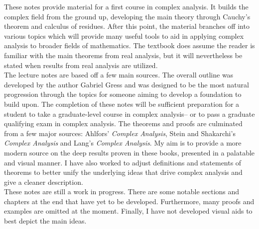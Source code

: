 \documentclass{memoir}
\begin{document}


These notes provide material for a first course in complex analysis. It builds the complex field from the ground up, developing the main theory through Cauchy's theorem and calculus of residues. After this point, the material branches off into various topics which will provide many useful tools to aid in applying complex analysis to broader fields of mathematics. The textbook does assume the reader is familiar with the main theorems from real analysis, but it will nevertheless be stated when results from real analysis are utilized.\\

The lecture notes are based off a few main sources. The overall outline was developed by the author Gabriel Gress and was designed to be the most natural progression through the topics for someone aiming to develop a foundation to build upon. The completion of these notes will be sufficient preparation for a student to take a graduate-level course in complex analysis-- or to pass a graduate qualifying exam in complex analysis. The theorems and proofs are culminated from a few major sources: Ahlfors' \textit{Complex Analysis}, Stein and Shakarchi's \textit{Complex Analysis} and Lang's \textit{Complex Analysis}. My aim is to provide a more modern source on the deep results proven in these books, presented in a palatable and visual manner. I have also worked to adjust definitions and statements of theorems to better unify the underlying ideas that drive complex analysis and give a cleaner description.\\

These notes are still a work in progress. There are some notable sections and chapters at the end that have yet to be developed. Furthermore, many proofs and examples are omitted at the moment. Finally, I have not developed visual aids to best depict the main ideas.

\end{document}

